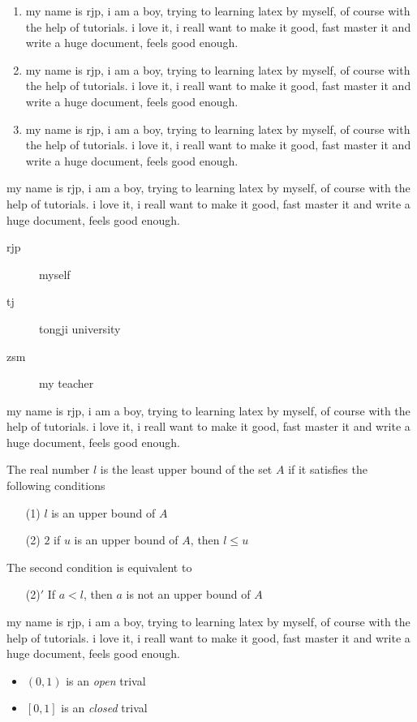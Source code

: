 \documentclass[a4paper, UTF8]{article}
\begin{document}
\begin{enumerate}[{A}1]
    \item my name is rjp, i am a boy, trying to learning latex by myself, of course with the help of tutorials. i love it, i reall want to make it good, fast master it and write a huge document, feels good enough.
    \item my name is rjp, i am a boy, trying to learning latex by myself, of course with the help of tutorials. i love it, i reall want to make it good, fast master it and write a huge document, feels good enough.
    \item my name is rjp, i am a boy, trying to learning latex by myself, of course with the help of tutorials. i love it, i reall want to make it good, fast master it and write a huge document, feels good enough.
\end{enumerate}

my name is rjp, i am a boy, trying to learning latex by myself, of course with the help of tutorials. i love it, i reall want to make it good, fast master it and write a huge document, feels good enough.

\renewcommand{\descriptionlabel}[1]{\hspace{1cm}\textsf{#1}}
\begin{description}
    \item[rjp] myself
    \item[tj] tongji university
    \item[zsm] my teacher  
\end{description}

my name is rjp, i am a boy, trying to learning latex by myself, of course with the help of tutorials. i love it, i reall want to make it good, fast master it and write a huge document, feels good enough.

The real number $l$ is the least upper bound of the set $A$ if it satisfies the following conditions 
\begin{enumerate}
	\item[(1)] $l$ is an upper bound of $A$
	\item[(2)] $2$ if $u$ is an upper bound of $A$, then $l\le u$  
\end{enumerate}
The second condition is equivalent to 
\begin{enumerate}
	\item[(2)$'$] If $a<l$, then $a$ is not an upper bound of $A$
\end{enumerate}

my name is rjp, i am a boy, trying to learning latex by myself, of course with the help of tutorials. i love it, i reall want to make it good, fast master it and write a huge document, feels good enough.

\begin{itemize}
    \item $(0,1)$ is an \emph{open} trival
    \item $[0,1]$ is an \emph{closed} trival
\end{itemize}
\end{document}
